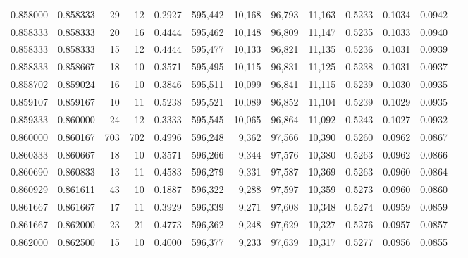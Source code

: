 \begin{tabular}{rrrrrrrrrrrrr}
0.858000 & 0.858333 &    29 &  12 &                                     0.2927 & 595,442 &  10,168 &  96,793 &  11,163 & 0.5233 & 0.1034 & 0.0942 \\
0.858333 & 0.858333 &    20 &  16 &                                     0.4444 & 595,462 &  10,148 &  96,809 &  11,147 & 0.5235 & 0.1033 & 0.0940 \\
0.858333 & 0.858333 &    15 &  12 &                                     0.4444 & 595,477 &  10,133 &  96,821 &  11,135 & 0.5236 & 0.1031 & 0.0939 \\
0.858333 & 0.858667 &    18 &  10 &                                     0.3571 & 595,495 &  10,115 &  96,831 &  11,125 & 0.5238 & 0.1031 & 0.0937 \\
0.858702 & 0.859024 &    16 &  10 &                                     0.3846 & 595,511 &  10,099 &  96,841 &  11,115 & 0.5239 & 0.1030 & 0.0935 \\
0.859107 & 0.859167 &    10 &  11 &                                     0.5238 & 595,521 &  10,089 &  96,852 &  11,104 & 0.5239 & 0.1029 & 0.0935 \\
0.859333 & 0.860000 &    24 &  12 &                                     0.3333 & 595,545 &  10,065 &  96,864 &  11,092 & 0.5243 & 0.1027 & 0.0932 \\
0.860000 & 0.860167 &   703 & 702 &                                     0.4996 & 596,248 &   9,362 &  97,566 &  10,390 & 0.5260 & 0.0962 & 0.0867 \\
0.860333 & 0.860667 &    18 &  10 &                                     0.3571 & 596,266 &   9,344 &  97,576 &  10,380 & 0.5263 & 0.0962 & 0.0866 \\
0.860690 & 0.860833 &    13 &  11 &                                     0.4583 & 596,279 &   9,331 &  97,587 &  10,369 & 0.5263 & 0.0960 & 0.0864 \\
0.860929 & 0.861611 &    43 &  10 &                                     0.1887 & 596,322 &   9,288 &  97,597 &  10,359 & 0.5273 & 0.0960 & 0.0860 \\
0.861667 & 0.861667 &    17 &  11 &                                     0.3929 & 596,339 &   9,271 &  97,608 &  10,348 & 0.5274 & 0.0959 & 0.0859 \\
0.861667 & 0.862000 &    23 &  21 &                                     0.4773 & 596,362 &   9,248 &  97,629 &  10,327 & 0.5276 & 0.0957 & 0.0857 \\
0.862000 & 0.862500 &    15 &  10 &                                     0.4000 & 596,377 &   9,233 &  97,639 &  10,317 & 0.5277 & 0.0956 & 0.0855 \\

\end{tabular}
